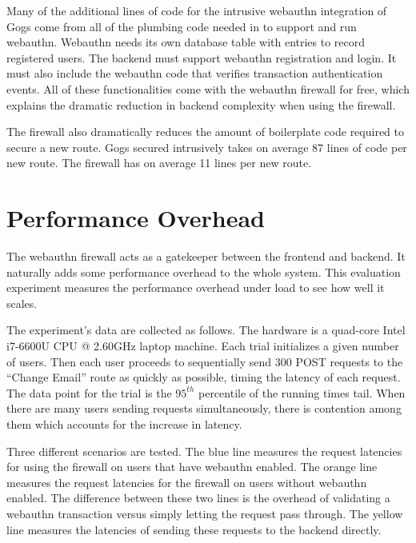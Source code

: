 Many of the additional lines of code for the intrusive webauthn integration of Gogs come from all of the plumbing code needed in to support and run webauthn. Webauthn needs its own database table with entries to record registered users. The backend must support webauthn registration and login. It must also include the webauthn code that verifies transaction authentication events. All of these functionalities come with the webauthn firewall for free, which explains the dramatic reduction in backend complexity when using the firewall.

The firewall also dramatically reduces the amount of boilerplate code required to secure a new route. Gogs secured intrusively takes on average 87 lines of code per new route. The firewall has on average 11 lines per new route.

\iffalse
minimally invasive

Not all of the routes covered by the webauthn firewall case study of Gogs were done intrusively, but only the handful secured are enough to outline the minimal.
\fi

\section{Performance Overhead}

The webauthn firewall acts as a gatekeeper between the frontend and backend. It naturally adds some performance overhead to the whole system. This evaluation experiment measures the performance overhead under load to see how well it scales. 

The experiment's data are collected as follows. The hardware is a quad-core Intel i7-6600U CPU @ 2.60GHz laptop machine. Each trial initializes a given number of users. Then each user proceeds to sequentially send 300 POST requests to the ``Change Email'' route as quickly as possible, timing the latency of each request. The data point for the trial is the $95^{th}$ percentile of the running times tail. When there are many users sending requests simultaneously, there is contention among them which accounts for the increase in latency.

Three different scenarios are tested. The blue line measures the request latencies for using the firewall on users that have webauthn enabled. The orange line measures the request latencies for the firewall on users without webauthn enabled. The difference between these two lines is the overhead of validating a webauthn transaction versus simply letting the request pass through. The yellow line measures the latencies of sending these requests to the backend directly.

